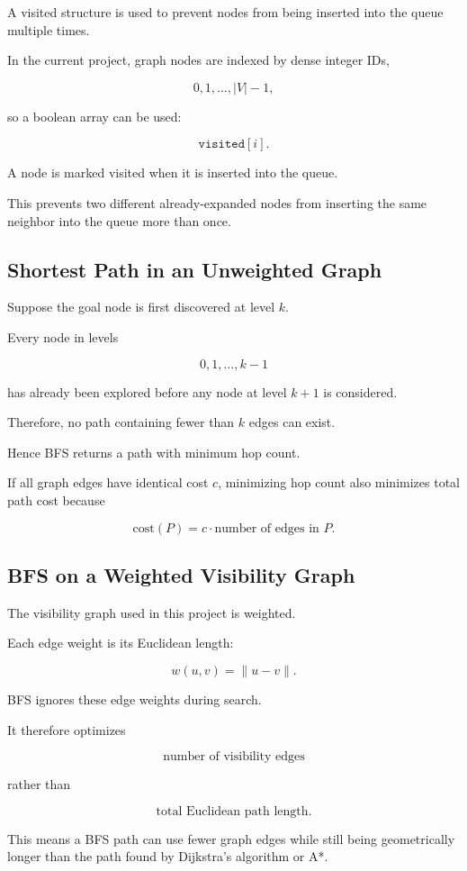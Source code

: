 A visited structure is used to prevent nodes from being inserted into the
queue multiple times.

In the current project, graph nodes are indexed by dense integer IDs,

\[
0,1,\ldots,|V|-1,
\]

so a boolean array can be used:

\[
\texttt{visited}[i].
\]

A node is marked visited when it is inserted into the queue.

This prevents two different already-expanded nodes from inserting the same
neighbor into the queue more than once.

\subsection{Shortest Path in an Unweighted Graph}

Suppose the goal node is first discovered at level $k$.

Every node in levels

\[
0,1,\ldots,k-1
\]

has already been explored before any node at level $k+1$ is considered.

Therefore, no path containing fewer than $k$ edges can exist.

Hence BFS returns a path with minimum hop count.

If all graph edges have identical cost $c$, minimizing hop count also
minimizes total path cost because

\[
\text{cost}(P)
=
c \cdot
\text{number of edges in }P.
\]

\subsection{BFS on a Weighted Visibility Graph}

The visibility graph used in this project is weighted.

Each edge weight is its Euclidean length:

\[
w(u,v)
=
\|u-v\|.
\]

BFS ignores these edge weights during search.

It therefore optimizes

\[
\text{number of visibility edges}
\]

rather than

\[
\text{total Euclidean path length}.
\]

This means a BFS path can use fewer graph edges while still being
geometrically longer than the path found by Dijkstra's algorithm or A*.

